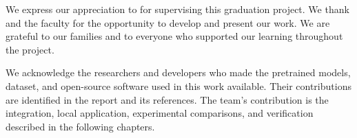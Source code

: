 We express our appreciation to \SupervisorName{} for supervising this graduation
project. We thank \UniversityName{} and the faculty for the opportunity to develop
and present our work. We are grateful to our families and to everyone who
supported our learning throughout the project.

We acknowledge the researchers and developers who made the pretrained models,
dataset, and open-source software used in this work available. Their contributions
are identified in the report and its references. The team's contribution is the
integration, local application, experimental comparisons, and verification
described in the following chapters.
\clearpage

